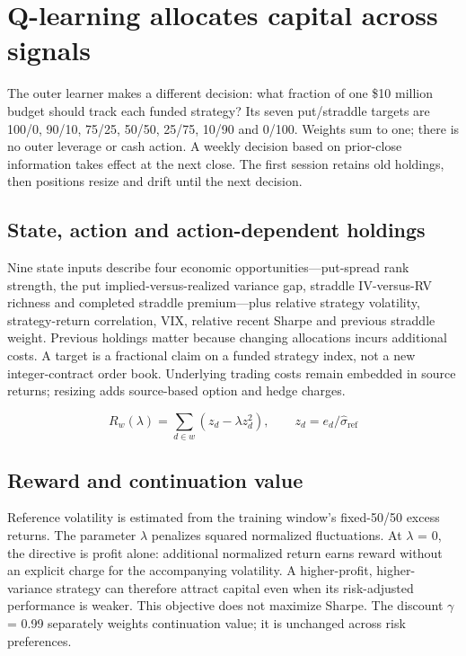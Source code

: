 \section{Q-learning allocates capital across signals}\label{sec:14}

The outer learner makes a different decision: what fraction of one \$10 million budget should track each funded strategy? Its seven put/straddle targets are 100/0, 90/10, 75/25, 50/50, 25/75, 10/90 and 0/100. Weights sum to one; there is no outer leverage or cash action. A weekly decision based on prior-close information takes effect at the next close. The first session retains old holdings, then positions resize and drift until the next decision.


\subsection*{State, action and action-dependent holdings}

Nine state inputs describe four economic opportunities---put-spread rank strength, the put implied-versus-realized variance gap, straddle IV-versus-RV richness and completed straddle premium---plus relative strategy volatility, strategy-return correlation, VIX, relative recent Sharpe and previous straddle weight. Previous holdings matter because changing allocations incurs additional costs. A target is a fractional claim on a funded strategy index, not a new integer-contract order book. Underlying trading costs remain embedded in source returns; resizing adds source-based option and hedge charges.


\begin{equation*}R_w(\lambda)=\sum_{d\in w}(z_d-\lambda z_d^2),\qquad z_d=e_d/\widehat{\sigma}_{\mathrm{ref}}\end{equation*}

\subsection*{Reward and continuation value}

Reference volatility is estimated from the training window's fixed-50/50 excess returns. The parameter \(\lambda\) penalizes squared normalized fluctuations. At \(\lambda\) = 0, the directive is profit alone: additional normalized return earns reward without an explicit charge for the accompanying volatility. A higher-profit, higher-variance strategy can therefore attract capital even when its risk-adjusted performance is weaker. This objective does not maximize Sharpe. The discount \(\gamma\) = 0.99 separately weights continuation value; it is unchanged across risk preferences.


